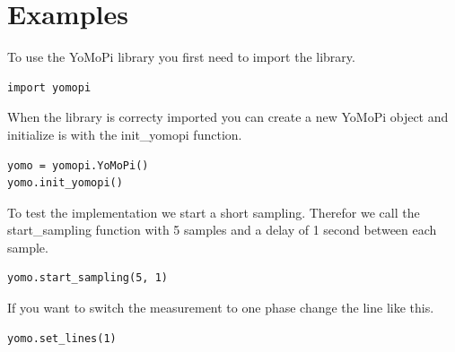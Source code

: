 \documentclass{scrartcl}  %
\begin{document}
\section{Examples}
To use the YoMoPi library you first need to import the library.

\begin{lstlisting}
import yomopi
\end{lstlisting}

When the library is correcty imported you can create a new YoMoPi object and initialize is with the init_yomopi function.
\begin{lstlisting}
yomo = yomopi.YoMoPi()
yomo.init_yomopi()
\end{lstlisting}

To test the implementation we start a short sampling. Therefor we call the start_sampling function with 5 samples and a delay of 1 second between each sample.
\begin{lstlisting}
yomo.start_sampling(5, 1)
\end{lstlisting}

If you want to switch the measurement to one phase change the line like this.
\begin{lstlisting}
yomo.set_lines(1)
\end{lstlisting}

\newpage
\listoffigures
\end{document}
